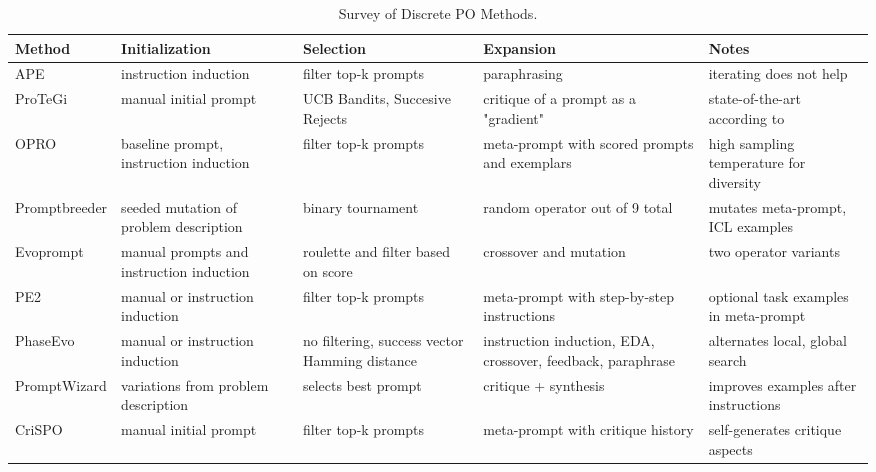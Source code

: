 \begin{landscape}
\begin{table}[htbp]
\centering
\caption{Survey of Discrete PO Methods.}\label{tab:optsurvey}
\begin{tabularx}{\linewidth}{@{}l Y Y Y Y@{}}
\toprule
\textbf{Method} & \textbf{Initialization} & \textbf{Selection} & \textbf{Expansion} & \textbf{Notes} \\
\midrule

APE\cite{zhou2023largelanguagemodelshumanlevel} & instruction induction & filter top-k prompts & paraphrasing & iterating does not help \\
ProTeGi\cite{pryzant2023automaticpromptoptimizationgradient} & manual initial prompt & UCB Bandits, Succesive Rejects & critique of a prompt as a "gradient" & state-of-the-art according to\cite{wan2024teachbettersmarterinstructions} \\
OPRO\cite{yang2024largelanguagemodelsoptimizers} & baseline prompt, instruction induction & filter top-k prompts & meta-prompt with scored prompts and exemplars & high sampling temperature for diversity \\
Promptbreeder\cite{fernando2023promptbreederselfreferentialselfimprovementprompt} & seeded mutation of problem description & binary tournament & random operator out of 9 total & mutates meta-prompt, ICL examples \\
Evoprompt\cite{guo2024connectinglargelanguagemodels} & manual prompts and instruction induction & roulette and filter based on score & crossover and mutation & two operator variants \\
PE2\cite{ye2024promptengineeringpromptengineer} & manual or instruction induction & filter top-k prompts & meta-prompt with step-by-step instructions & optional task examples in meta-prompt \\
PhaseEvo\cite{cui2024phaseevounifiedincontextprompt} & manual or instruction induction & no filtering, success vector Hamming distance & instruction induction, EDA, crossover, feedback, paraphrase & alternates local, global search \\
PromptWizard\cite{agarwal2024promptwizardtaskawarepromptoptimization} & variations from problem description & selects best prompt & critique + synthesis & improves examples after instructions \\
CriSPO\cite{he2024crispomultiaspectcritiquesuggestionguidedautomatic} & manual initial prompt & filter top-k prompts & meta-prompt with critique history & self-generates critique aspects \\

\end{tabularx}
\end{table}
\end{landscape}

